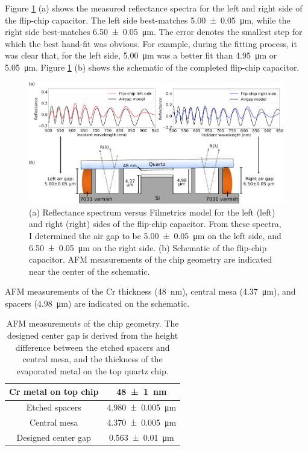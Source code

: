 \documentclass{beavtex_dub_edit}
\begin{document}
Figure \ref{FCCap Ref Summ} (a) shows the measured reflectance spectra for the left and right side of the flip-chip capacitor. The left side best-matches \SI{5.00(5)}{\micro\meter}, while the right side best-matches \SI{6.50(5)}{\micro\meter}. The error denotes the smallest step for which the best hand-fit was obvious. For example, during the fitting process, it was clear that, for the left side, \SI{5.00}{\micro\meter} was a better fit than \SI{4.95}{\micro\meter} or \SI{5.05}{\micro\meter}. Figure \ref{FCCap Ref Summ} (b) shows the schematic of the completed flip-chip capacitor.
\begin{figure}
    \includegraphics[width = 1\textwidth]{Flip-chip capacitor reflectance summary.pdf}
    \caption[(a) Reflectance spectrum versus Filmetrics model for the left (left) and right (right) sides of the flip-chip capacitor. (b) Schematic of the flip-chip capacitor.]{(a) Reflectance spectrum versus Filmetrics model for the left (left) and right (right) sides of the flip-chip capacitor. From these spectra, I determined the air gap to be \SI{5.00(5)}{\micro\meter} on the left side, and \SI{6.50(5)}{\micro\meter} on the right side. (b) Schematic of the flip-chip capacitor. AFM measurements of the chip geometry are indicated near the center of the schematic.}
    \label{FCCap Ref Summ}
\end{figure}
AFM measurements of the Cr thickness (\SI{48}{\nano\meter}), central mesa (\SI{4.37}{\micro\meter}), and spacers (\SI{4.98}{\micro\meter}) are indicated on the schematic.

\begin{table}
    \centering
    \begin{tabular}{|c|c|}
        \hline
        Cr metal on top chip & \SI{48(1)}{\nano\meter} \\
        \hline
        Etched spacers & \SI{4.980(5)}{\micro\meter} \\
        \hline
        Central mesa & \SI{4.370(5)}{\micro\meter} \\
        \hline
        \hline
        Designed center gap & \SI{0.563(10)}{\micro\meter} \\
        \hline
    \end{tabular}
    \caption{AFM measurements of the chip geometry. The designed center gap is derived from the height difference between the etched spacers and central mesa, and the thickness of the evaporated metal on the top quartz chip.}
    \label{flip-chip AFM table}
\end{table}
\end{document}
